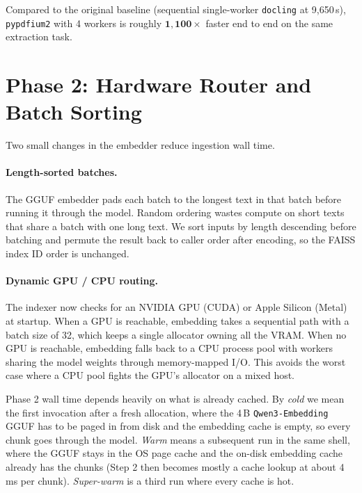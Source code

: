 \documentclass[sigconf]{acmart}
\begin{document}
Compared to the original baseline (sequential single-worker
\texttt{docling} at 9{,}650\,s), \texttt{pypdfium2} with 4 workers is
roughly $\mathbf{1{,}100\times}$ faster end to end on the same
extraction task.

\section{Phase 2: Hardware Router and Batch Sorting}

Two small changes in the embedder reduce ingestion wall time.

\paragraph{Length-sorted batches.}
The GGUF embedder pads each batch to the longest text in that batch
before running it through the model. Random ordering wastes compute on
short texts that share a batch with one long text. We sort inputs by
length descending before batching and permute the result back to
caller order after encoding, so the FAISS index ID order is unchanged.

\paragraph{Dynamic GPU / CPU routing.}
The indexer now checks for an NVIDIA GPU (CUDA) or Apple Silicon
(Metal) at startup. When a GPU is reachable, embedding takes a
sequential path with a batch size of 32, which keeps a single
allocator owning all the VRAM. When no GPU is reachable, embedding
falls back to a CPU process pool with workers sharing the model
weights through memory-mapped I/O. This avoids the worst case where a
CPU pool fights the GPU's allocator on a mixed host.

Phase 2 wall time depends heavily on what is already cached. By
\emph{cold} we mean the first invocation after a fresh allocation,
where the 4\,B \texttt{Qwen3-Embedding} GGUF has to be paged in from
disk and the embedding cache is empty, so every chunk goes through the
model. \emph{Warm} means a subsequent run in the same shell, where the
GGUF stays in the OS page cache and the on-disk embedding cache
already has the chunks (Step 2 then becomes mostly a cache lookup at
about 4\,ms per chunk). \emph{Super-warm} is a third run where every
cache is hot.
\end{document}
